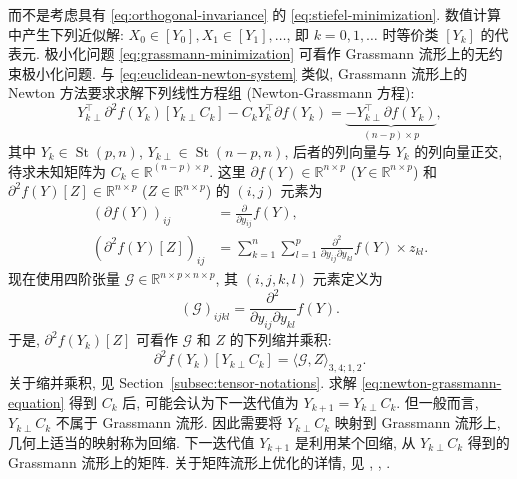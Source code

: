 {而不是考虑具有 \eqref{eq:orthogonal-invariance} 的 \eqref{eq:stiefel-minimization}. 数值计算中产生下列近似解: $X_0\in[Y_0],X_1\in[Y_1],\ldots$, 即 $k=0,1,\ldots$ 时等价类 $[Y_k]$ 的代表元.}
{极小化问题 \eqref{eq:grassmann-minimization} 可看作 Grassmann 流形上的无约束极小化问题. 与 \eqref{eq:euclidean-newton-system} 类似, Grassmann 流形上的 Newton 方法要求求解下列线性方程组 (Newton-Grassmann 方程):}
\begin{equation}\label{eq:newton-grassmann-equation}
Y_{k\perp}^{\top}\partial^2f(Y_k)[Y_{k\perp}C_k]-C_kY_k^{\top}\partial f(Y_k)
=\underbrace{-Y_{k\perp}^{\top}\partial f(Y_k)}_{(n-p)\times p},
\end{equation}
{其中 $Y_k\in\operatorname{St}(p,n)$, $Y_{k\perp}\in\operatorname{St}(n-p,n)$, 后者的列向量与 $Y_k$ 的列向量正交, 待求未知矩阵为 $C_k\in\mathbb{R}^{(n-p)\times p}$. 这里 $\partial f(Y)\in\mathbb{R}^{n\times p}$ ($Y\in\mathbb{R}^{n\times p}$) 和 $\partial^2f(Y)[Z]\in\mathbb{R}^{n\times p}$ ($Z\in\mathbb{R}^{n\times p}$) 的 $(i,j)$ 元素为}
\[\begin{aligned}
(\partial f(Y))_{ij}&=\frac{\partial}{\partial y_{ij}}f(Y),\\
(\partial^2f(Y)[Z])_{ij}&=\sum_{k=1}^n\sum_{l=1}^p\frac{\partial^2}{\partial y_{ij}\partial y_{kl}}f(Y)\times z_{kl}.
\end{aligned}\]
{现在使用四阶张量 $\mathcal{G}\in\mathbb{R}^{n\times p\times n\times p}$, 其 $(i,j,k,l)$ 元素定义为}
\[(\mathcal{G})_{ijkl}=\frac{\partial^2}{\partial y_{ij}\partial y_{kl}}f(Y).\]
{于是, $\partial^2f(Y_k)[Z]$ 可看作 $\mathcal{G}$ 和 $Z$ 的下列缩并乘积:}
\[\partial^2f(Y_k)[Y_{k\perp}C_k]=\langle\mathcal{G},Z\rangle_{3,4;1,2}.\]
{关于缩并乘积, 见 Section\ \ref{subsec:tensor-notations}. 求解 \eqref{eq:newton-grassmann-equation} 得到 $C_k$ 后, 可能会认为下一迭代值为 $Y_{k+1}=Y_{k\perp}C_k$. 但一般而言, $Y_{k\perp}C_k$ 不属于 Grassmann 流形. 因此需要将 $Y_{k\perp}C_k$ 映射到 Grassmann 流形上, 几何上适当的映射称为回缩. 下一迭代值 $Y_{k+1}$ 是利用某个回缩, 从 $Y_{k\perp}C_k$ 得到的 Grassmann 流形上的矩阵. 关于矩阵流形上优化的详情, 见 , , .}
